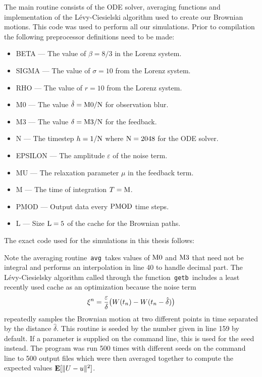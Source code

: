 \documentclass[master,tocprelim,12pt]{unrthesis}
\theoremstyle{definition}
\numberwithin{equation}{chapter}
\begin{document}
\begin{manuscript}
The main routine consists of the ODE solver, averaging functions
and implementation of the L\'evy-Ciesielski algorithm used to
create our Brownian motions.
This code was used to perform all our simulations.  
Prior to compilation the following
preprocessor definitions need to be made:
\begin{itemize}
\item {\rm BETA} --- The value of $\beta=8/3$ in the Lorenz system.
\item {\rm SIGMA} --- The value of $\sigma=10$ from the Lorenz system.
\item {\rm RHO} --- The value of $r=10$ from the Lorenz system.
\item {\rm M0} --- The value $\hat\delta={\rm M0}/{\rm N}$ for observation blur.
\item {\rm M3} --- The value $\delta={\rm M3}/{\rm N}$ for the feedback.
\item {\rm N} --- The timestep $h=1/{\rm N}$ where ${\rm N}=2048$ 
		for the ODE solver.
\item {\rm EPSILON} --- The amplitude $\varepsilon$ of the noise term.
\item {\rm MU} --- The relaxation parameter $\mu$ in the feedback term.
\item {\rm M} --- The time of integration $T={\rm M}$.
\item {\rm PMOD} --- Output data every ${\rm PMOD}$ time steps.
\item {\rm L} --- Size ${\rm L}=5$ of the cache for the Brownian paths.
\end{itemize}
The exact code used for the simulations in this thesis follows:
\bigskip



Note the averaging routine{\tt\ avg }takes values of 
${\rm M0}$ and ${\rm M3}$ 
that need not be integral and performs an interpolation in 
line 40 to handle decimal part.
The L\'evy-Ciesielsky algorithm called through
the function{\tt\ getb }includes a least recently used
cache as an optimization because the noise term
$$
	\xi^n={\varepsilon \over\delta}\big(
		W(t_n)-W(t_n-\hat\delta)\big)
$$
repeatedly samples the Brownian motion at two different points
in time separated by the distance $\hat\delta$.  
This routine is seeded by the number given in line 159 by
default.  If a parameter is supplied on the command line,
this is used for the seed instead.  The
program was run 500 times with different seeds on the
command line to 500 output files which were then
averaged together to compute the expected values
${\bf E}[\|U-u\|^2]$.


\end{manuscript}
\end{document}
